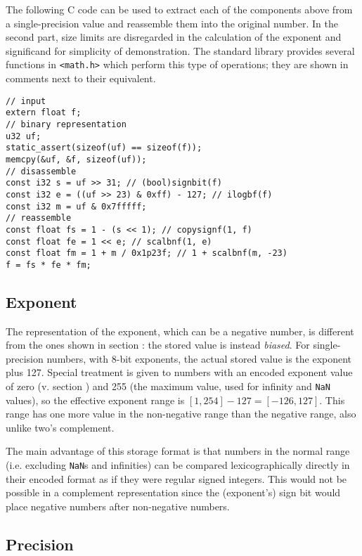 The following C code can be used to extract each of the components above from a
single-precision value and reassemble them into the original number.  In the
second part, size limits are disregarded in the calculation of the exponent and
significand for simplicity of demonstration.  The standard library provides
several functions in \texttt{<math.h>} which perform this type of operations;
they are shown in comments next to their equivalent.

\begin{lstlisting}[style=c]
// input
extern float f;
// binary representation
u32 uf;
static_assert(sizeof(uf) == sizeof(f));
memcpy(&uf, &f, sizeof(uf));
// disassemble
const i32 s = uf >> 31; // (bool)signbit(f)
const i32 e = ((uf >> 23) & 0xff) - 127; // ilogbf(f)
const i32 m = uf & 0x7fffff;
// reassemble
const float fs = 1 - (s << 1); // copysignf(1, f)
const float fe = 1 << e; // scalbnf(1, e)
const float fm = 1 + m / 0x1p23f; // 1 + scalbnf(m, -23)
f = fs * fe * fm;
\end{lstlisting}

\subsection{Exponent}

\label{subsec:arch:float_exp}

The representation of the exponent, which can be a negative number, is different
from the ones shown in section : the stored
value is instead \textit{biased}.  For single-precision numbers, with 8-bit
exponents, the actual stored value is the exponent plus 127.  Special treatment
is given to numbers with an encoded exponent value of zero (v. section
) and 255 (the maximum value, used for infinity
and \texttt{NaN} values), so the effective exponent range is $[1, 254] - 127 =
[-126,127]$.  This range has one more value in the non-negative range than the
negative range, also unlike two's complement.

The main advantage of this storage format is that numbers in the normal range
(i.e. excluding \texttt{NaN}s and infinities) can be compared lexicographically
directly in their encoded format as if they were regular signed integers.  This
would not be possible in a complement representation since the (exponent's) sign
bit would place negative numbers after non-negative numbers.

\subsection{Precision}

